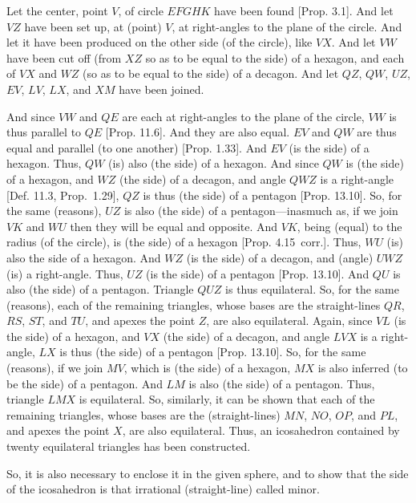 \begin{Parallel}{}{}
{\epsfysize=3.5in
\centerline{}

Let the center, point $V$, of circle $EFGHK$ have been found [Prop. 3.1]. 
And let $VZ$ have been set up, at (point) $V$,  at right-angles to the plane of the
circle. And let it have been produced on the other side (of the circle), 
like $VX$. And let $VW$ have been cut off 
(from $XZ$ so as to be equal to the side) of a hexagon, and each of $VX$ and 
$WZ$ (so as to be equal to the side) of a decagon. And let
$QZ$,  $QW$, $UZ$, $EV$, $LV$, $LX$, and
$XM$ have been joined.

And since $VW$ and $QE$ are each at right-angles to the plane of the
circle, $VW$ is thus parallel to $QE$ [Prop. 11.6].  And they are also
equal. $EV$ and $QW$ are thus equal and parallel (to one another) [Prop. 1.33]. And $EV$ (is the side) of a hexagon. Thus, $QW$
(is) also (the side) of a hexagon. And since $QW$ is (the side) of a hexagon, 
and $WZ$ (the side) of a decagon, and angle $QWZ$ is a right-angle
[Def. 11.3, Prop.~1.29], 
$QZ$ is thus (the side) of a pentagon [Prop. 13.10]. So, for the same
(reasons), $UZ$ is also (the side) of a pentagon---inasmuch as, if we join
$VK$ and $WU$ then they will be equal and opposite. 
And $VK$, being (equal)
to the radius (of the circle), is (the side) of a hexagon [Prop. 4.15~corr.].
Thus, $WU$ (is) also the side of a hexagon.
 And $WZ$
(is the side) of a decagon, and (angle) $UWZ$ (is) a right-angle. 
Thus, $UZ$ (is the side) of a pentagon [Prop. 13.10]. And $QU$ is
also (the side) of a pentagon. Triangle $QUZ$ is thus equilateral. So,
for the same (reasons), each of the remaining triangles, whose bases
are the straight-lines $QR$, $RS$, $ST$, and $TU$, and apexes the point
$Z$, are also equilateral. Again, since $VL$ (is the side) of a hexagon, and $VX$ (the side) of a decagon, and angle $LVX$ is a right-angle, 
$LX$ is thus (the side) of a pentagon [Prop. 13.10]. So, for the same
(reasons), if we join $MV$, which is (the side) of a hexagon, $MX$
is also inferred (to be the side) of a pentagon. And $LM$ is also (the side)
of a pentagon. Thus, triangle $LMX$ is equilateral. So, similarly,
it can be shown that each of the remaining triangles, whose bases
are the (straight-lines) $MN$, $NO$, $OP$, and $PL$, and apexes the
point $X$,  are also equilateral. Thus, an icosahedron contained by
twenty equilateral triangles has been constructed.

So, it is also necessary to enclose it in the given sphere, and to show
that the side of the icosahedron is that irrational (straight-line) called minor.

}
\end{Parallel}
